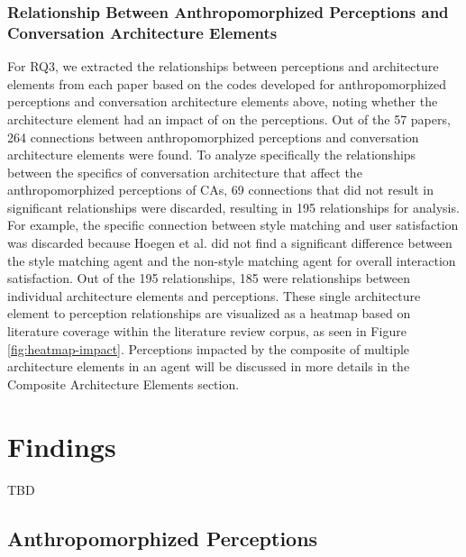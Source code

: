 \documentclass[sigconf,screen,review, anonymous]{acmart}
\newcommand{\cmt}[1]{}%
\begin{document}
\subsubsection*{Relationship Between Anthropomorphized Perceptions and Conversation Architecture Elements}
For RQ3, we extracted the relationships between perceptions and architecture elements from each paper based on the codes developed for anthropomorphized perceptions and conversation architecture elements above, noting whether the architecture element had an impact of on the perceptions. Out of the 57 papers, 264 connections between anthropomorphized perceptions and conversation architecture elements were found. To analyze specifically the relationships between the specifics of conversation architecture that affect the anthropomorphized perceptions of CAs, 69 connections that did not result in significant relationships were discarded, resulting in 195 relationships for analysis. For example, the specific connection between style matching and user satisfaction was discarded because Hoegen et al. \cite{hoegen2019end}\cmt{[31]} did not find a significant difference between the style matching agent and the non-style matching agent for overall interaction satisfaction. Out of the 195 relationships, 185 were relationships between individual architecture elements and perceptions. These single architecture element to perception relationships are visualized as a heatmap based on literature coverage within the literature review corpus, as seen in Figure \ref{fig:heatmap-impact}. Perceptions impacted by the composite of multiple architecture elements in an agent will be discussed in more details in the Composite Architecture Elements section.

\section{Findings}

TBD

\subsection{Anthropomorphized Perceptions}
\end{document}
